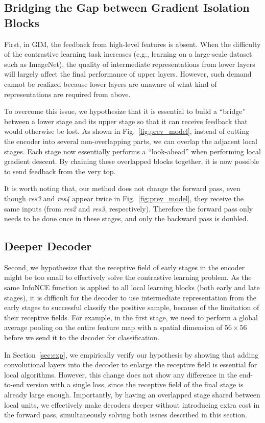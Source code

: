 \subsection{Bridging the Gap between Gradient Isolation Blocks}
\label{sec:gradient_isolation}
First, in GIM, the feedback from high-level features is absent. When the difficulty of the
contrastive learning task increases (e.g., learning on a large-scale dataset such as ImageNet), the
quality of intermediate representations from lower layers will largely affect the final performance
of  upper layers. However, such demand cannot be realized because lower layers are unaware of what
kind of representations are required from above.

To overcome this issue, we hypothesize that it is essential to build a ``bridge'' between a lower
stage and its upper stage so that it can receive feedback that would otherwise be lost. As shown in
Fig.~\ref{fig:prev_model}, instead of cutting the encoder into several non-overlapping parts, we can
overlap the adjacent local stages. Each stage now essentially performs a ``look-ahead'' when
performing local gradient descent. By chaining these overlapped blocks together, it is now possible
to send feedback from the very top.

It is worth noting that, our method does not change the forward pass, even though {\em res3} and
{\em res4} appear twice in Fig.~\ref{fig:prev_model}, they receive the same inputs (from {\em res2}
and {\em res3}, respectively). Therefore the forward pass only needs to be done once in these
stages, and only the backward pass is doubled.

\subsection{Deeper Decoder}
\label{sec:deeper_decoder}
Second, we hypothesize that the receptive field of early stages in the encoder might be too small to
effectively solve the contrastive learning problem. As the same InfoNCE function is applied to all
local learning blocks (both early and late stages), it is difficult for the decoder to use
intermediate representation from the early stages to successful classify the positive sample,
because of the limitation of their receptive fields. For example, in the first stage, we need to
perform a global average pooling on the entire feature map with a spatial dimension of $56\times56$
before we send it to the decoder for classification.

In Section~\ref{sec:exp}, we empirically verify our hypothesis by showing that adding convolutional
layers into the decoder to enlarge the receptive field is essential for local algorithms. However,
this change does not show any difference in the end-to-end version with a single loss, since the
receptive field of the final stage is already large enough. Importantly, by having an overlapped
stage shared between local units, we effectively make decoders deeper without introducing extra cost
in the forward pass, simultaneously solving both issues described in this section.